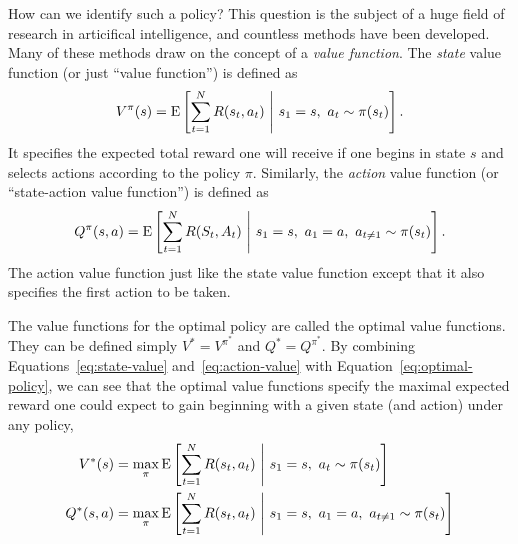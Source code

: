 How can we identify such a policy? This question is the subject of a huge field of research in articifical intelligence, and countless methods have been developed. Many of these methods draw on the concept of a \emph{value function}. The \emph{state} value function (or just ``value function'') is defined as
%
\begin{equation}\label{eq:state-value}
  V^\pi(s) = \operatorname*{E} \left[ 
    \sum_{t=1}^{N} R(s_t, a_t)
   \ \middle\vert\ 
   s_1 = s,\ a_t \sim \pi(s_t)
   \right].
\end{equation}
%
It specifies the expected total reward one will receive if one begins in state $s$ and selects actions according to the policy $\pi$. Similarly, the \emph{action} value function (or ``state-action value function'') is defined as
%
\begin{equation}\label{eq:action-value}
  Q^\pi(s, a) = \operatorname*{E} \left[ 
    \sum_{t=1}^{N} R(S_t, A_t)
   \ \middle\vert\ 
   s_1 = s,\ a_1 = a,\ a_{t \neq 1} \sim \pi(s_t)
   \right].
\end{equation}
%
The action value function just like the state value function except that it also specifies the first action to be taken. 

The value functions for the optimal policy are called the optimal value functions. They can be defined simply $V^* = V^{\pi^*}$ and $Q^* = Q^{\pi^*}$. By combining Equations~\ref{eq:state-value} and~\ref{eq:action-value} with Equation~\ref{eq:optimal-policy}, we can see that the optimal value functions specify the maximal expected reward one could expect to gain beginning with a given state (and action) under any policy,
\begin{equation}
  \begin{aligned}
  V^*(s) &= \max_\pi \operatorname*{E} \left[ 
    \sum_{t=1}^{N} R(s_t, a_t)
   \ \middle\vert\ 
   s_1 = s,\ a_t \sim \pi(s_t)
   \right] \\
  Q^*(s, a) &= \max_\pi \operatorname*{E} \left[ 
    \sum_{t=1}^{N} R(s_t, a_t)
   \ \middle\vert\ 
   s_1 = s,\ a_1 = a,\ a_{t \neq 1} \sim \pi(s_t)
   \right]
  \end{aligned}
\end{equation}


